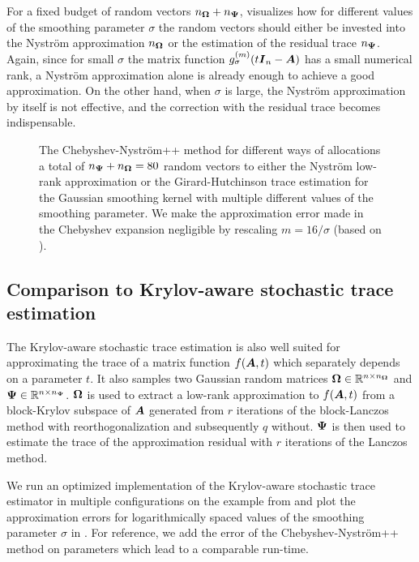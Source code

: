 For a fixed budget of random vectors $n_{\boldsymbol{\Omega}} + n_{\boldsymbol{\Psi}}$,  visualizes how for different values of the smoothing parameter $\sigma$ the random vectors should either be invested into the Nyström approximation $n_{\boldsymbol{\Omega}}$ or the estimation of the residual trace $n_{\boldsymbol{\Psi}}$. Again, since for small $\sigma$ the matrix function $g_{\sigma}^{(m)}(t \boldsymbol{I}_n - \boldsymbol{A})$ has a small numerical rank, a Nyström approximation alone is already enough to achieve a good approximation. On the other hand, when $\sigma$ is large, the Nyström approximation by itself is not effective, and the correction with the residual trace becomes indispensable.

\begin{figure}[ht]
    \centering
    
    \caption{The Chebyshev-Nyström++ method for different ways of allocations a total of $n_{\boldsymbol{\Psi}} + n_{\boldsymbol{\Omega}}=80$ random vectors to either the Nystr\"om low-rank approximation or the Girard-Hutchinson trace estimation for the Gaussian smoothing kernel with multiple different values of the smoothing parameter. We make the approximation error made in the Chebyshev expansion negligible by rescaling $m=16 / \sigma$ (based on ).}
    \label{fig:distribution}
\end{figure}

\subsection{Comparison to Krylov-aware stochastic trace estimation}
\label{subsec:krylov-aware}

The Krylov-aware stochastic trace estimation \cite{chen-2023-krylovaware-stochastic} is also well suited for approximating the trace of a matrix function $f(\boldsymbol{A}, t)$ which separately depends on a parameter $t$. It also samples two Gaussian random matrices $\boldsymbol{\Omega} \in \mathbb{R}^{n \times n_{\boldsymbol{\Omega}}}$ and $\boldsymbol{\Psi} \in \mathbb{R}^{n \times n_{\boldsymbol{\Psi}}}$. $\boldsymbol{\Omega}$ is used to extract a low-rank approximation to $f(\boldsymbol{A}, t)$ from a block-Krylov subspace of $\boldsymbol{A}$ generated from $r$ iterations of the block-Lanczos method with reorthogonalization and subsequently $q$ without. $\boldsymbol{\Psi}$ is then used to estimate the trace of the approximation residual with $r$ iterations of the Lanczos method.

We run an optimized implementation of the Krylov-aware stochastic trace estimator \cite[Algorithm 3.1]{chen-2023-krylovaware-stochastic} in multiple configurations on the example from  and plot the approximation errors for logarithmically spaced values of the smoothing parameter $\sigma$ in . For reference, we add the error of the Chebyshev-Nyström++ method on parameters which lead to a comparable run-time.

